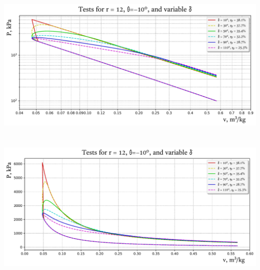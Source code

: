     \begin{frame}{}\vspace*{-2em}
        \begin{center}
            \noindent\hspace*{-3.0mm}\includegraphics[height=70.0mm]{fig/test_r=12,0_speed.pdf}
        \end{center}
    \end{frame}

    \begin{frame}{}\vspace*{-2em}
        \begin{center}
            \noindent\hspace*{-4.5mm}\includegraphics[height=70.0mm]{fig/test_r=12,0_speed-P.pdf}
        \end{center}
    \end{frame}

